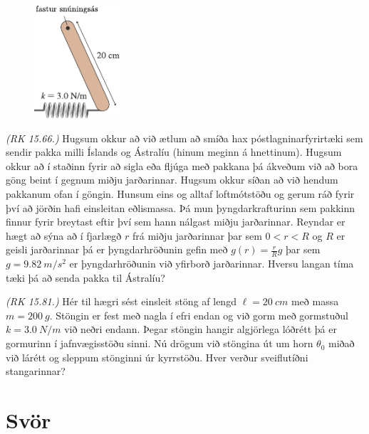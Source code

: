 \ifdefined \wholebook \else\documentclass[oneside]{book}\usepackage{EdlBook}\graphicspath{{figures/}}
\begin{document}
\begin{enumerate}[label = \textbf{Dæmi \thechapter.\arabic*.}]
\begin{minipage}{\linewidth}

\begin{figure}
\vspace{0.5cm}
\includegraphics[width=1.25in]{figures/fastur-snunas.pdf}
\end{figure}

\item \textit{(RK 15.66.)} Hugsum okkur að við ætlum að smíða hax póstlagninarfyrirtæki sem sendir pakka milli Íslands og Ástralíu (hinum meginn á hnettinum). Hugsum okkur að í staðinn fyrir að sigla eða fljúga með pakkana þá ákveðum við að bora göng beint í gegnum miðju jarðarinnar. Hugsum okkur síðan að við hendum pakkanum ofan í göngin. Hunsum eins og alltaf loftmótstöðu og gerum ráð fyrir því að jörðin hafi einsleitan eðlismassa. Þá mun þyngdarkrafturinn sem pakkinn finnur fyrir breytast eftir því sem hann nálgast miðju jarðarinnar. Reyndar er hægt að sýna að í fjarlægð $r$ frá miðju jarðarinnar þar sem $0 < r < R$ og $R$ er geisli jarðarinnar þá er þyngdarhröðunin gefin með $g(r) = \frac{r}{R}g$ þar sem $g = \SI{9.82}{m/s^2}$ er þyngdarhröðunin við yfirborð jarðarinnar. Hversu langan tíma tæki þá að senda pakka til Ástralíu?

\item \textit{(RK 15.81.)} Hér til hægri sést einsleit stöng af lengd $\ell = \SI{20}{cm}$ með massa $m = \SI{200}{g}$. Stöngin er fest með nagla í efri endan og við gorm með gormstuðul $k = \SI{3.0}{N/m}$ við neðri endann. Þegar stöngin hangir algjörlega lóðrétt þá er gormurinn í jafnvægisstöðu sinni. Nú drögum við stöngina út um horn $\theta_0$ miðað við lárétt og sleppum stönginni úr kyrrstöðu. Hver verður sveiflutíðni stangarinnar?

\end{minipage}

\end{enumerate}


\section*{Svör}
\end{document}
